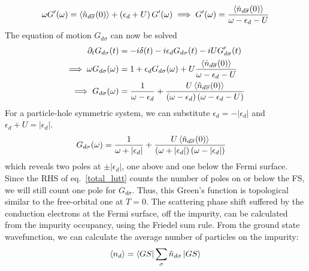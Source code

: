 \documentclass[12pt,twoside]{report}
\numberwithin{equation}{section}
\begin{document}
\begin{equation}\begin{aligned}
	 \omega G^\prime(\omega) =  \left< \hat n_{d\overline\sigma}(0)\right> + \left( \epsilon_d + U \right) G^\prime(\omega)\implies G^\prime(\omega) = \frac{\left< \hat n_{d\overline\sigma}(0)\right>}{\omega - \epsilon_d - U}
\end{aligned}\end{equation}
The equation of motion \(G_{d\sigma}\) can now be solved
\begin{equation}\begin{aligned}
	\partial_t G_{d\sigma}(t) &= -i \delta(t) - i\epsilon_d G_{d\sigma}(t) - iU G^\prime_{d\sigma}(t)\\
	\implies \omega G_{d\sigma}(\omega) &= 1 + \epsilon_d G_{d\sigma}(\omega) + U\frac{\left< \hat n_{d\overline\sigma}(0)\right>}{\omega - \epsilon_d - U}\\
	\implies G_{d\sigma}(\omega) &= \frac{1}{\omega - \epsilon_d} + \frac{U\left< \hat n_{d\overline\sigma}(0)\right>}{\left( \omega - \epsilon_d \right) \left(\omega - \epsilon_d - U\right)}
\end{aligned}\end{equation}
For a particle-hole symmetric system, we can substitute \(\epsilon_d = -|\epsilon_d|\) and \(\epsilon_d + U = |\epsilon_d|\).
\begin{equation}\begin{aligned}
	G_{d\sigma}(\omega) &= \frac{1}{\omega + |\epsilon_d|} + \frac{U\left< \hat n_{d\overline\sigma}(0)\right>}{\left( \omega + |\epsilon_d| \right) \left(\omega - |\epsilon_d|\right)}
\end{aligned}\end{equation}
which reveals two poles at \(\pm |\epsilon_d|\), one above and one below the Fermi surface. Since the RHS of eq.~\ref{total_lutt} counts the number of poles on or below the FS, we will still count one pole for \(G_{d\sigma}\). Thus, this Green's function is topological similar to the free-orbital one at \(T=0\).
\pb The scattering phase shift suffered by the conduction electrons at the Fermi surface, off the impurity, can be calculated from the impurity occupancy, using the Friedel sum rule. From the ground state wavefunction, we can calculate the average number of particles on the impurity:
\begin{equation}\begin{aligned}
	\left<n_d \right> = \bra{GS}\sum_\sigma \hat n_{d\sigma} \ket{GS}
\end{aligned}\end{equation}
\end{document}
